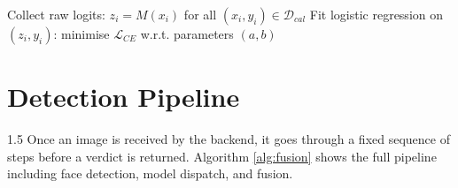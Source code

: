 \begin{algorithm}[H]
\SetAlgoLined
{}

Collect raw logits: $z_i = M(x_i)$ for all $(x_i, y_i) \in \mathcal{D}_{cal}$\;
Fit logistic regression on $(z_i, y_i)$: minimise $\mathcal{L}_{CE}$ w.r.t. parameters $(a, b)$\;
\caption{Platt Scaling Calibration}
\label{alg:platt}
\end{algorithm}

\section{Detection Pipeline}

\begin{spacing}{1.5}
Once an image is received by the backend, it goes through a fixed sequence of steps before a verdict is returned. Algorithm \ref{alg:fusion} shows the full pipeline including face detection, model dispatch, and fusion.
\end{spacing}

